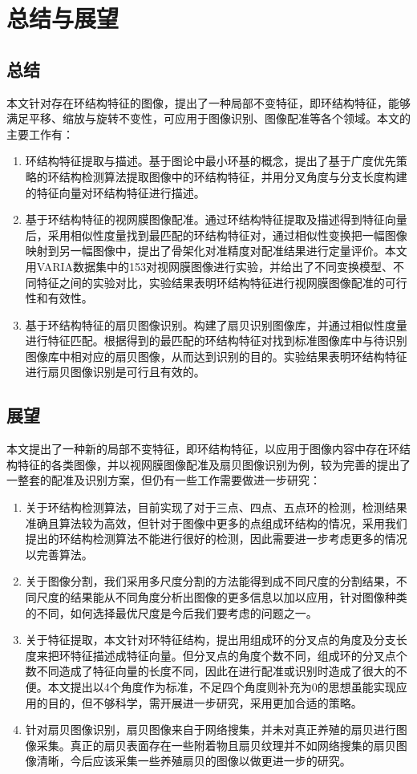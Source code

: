 

\chapter{总结与展望}
\label{cha:intro}

\section{总结}
\label{}
本文针对存在环结构特征的图像，提出了一种局部不变特征，即环结构特征，能够满足平移、缩放与旋转不变性，可应用于图像识别、图像配准等各个领域。本文的主要工作有：
\begin{enumerate}
\item 环结构特征提取与描述。基于图论中最小环基的概念，提出了基于广度优先策略的环结构检测算法提取图像中的环结构特征，并用分叉角度与分支长度构建的特征向量对环结构特征进行描述。

\item 基于环结构特征的视网膜图像配准。通过环结构特征提取及描述得到特征向量后，采用相似性度量找到最匹配的环结构特征对，通过相似性变换把一幅图像映射到另一幅图像中，提出了骨架化对准精度对配准结果进行定量评价。本文用VARIA数据集中的153对视网膜图像进行实验，并给出了不同变换模型、不同特征之间的实验对比，实验结果表明环结构特征进行视网膜图像配准的可行性和有效性。

\item 基于环结构特征的扇贝图像识别。构建了扇贝识别图像库，并通过相似性度量进行特征匹配。根据得到的最匹配的环结构特征对找到标准图像库中与待识别图像库中相对应的扇贝图像，从而达到识别的目的。实验结果表明环结构特征进行扇贝图像识别是可行且有效的。
\end{enumerate}
\section{展望}
\label{}
本文提出了一种新的局部不变特征，即环结构特征，以应用于图像内容中存在环结构特征的各类图像，并以视网膜图像配准及扇贝图像识别为例，较为完善的提出了一整套的配准及识别方案，但仍有一些工作需要做进一步研究：
\begin{enumerate}
\item 关于环结构检测算法，目前实现了对于三点、四点、五点环的检测，检测结果准确且算法较为高效，但针对于图像中更多的点组成环结构的情况，采用我们提出的环结构检测算法不能进行很好的检测，因此需要进一步考虑更多的情况以完善算法。
\item 关于图像分割，我们采用多尺度分割的方法能得到成不同尺度的分割结果，不同尺度的结果能从不同角度分析出图像的更多信息以加以应用，针对图像种类的不同，如何选择最优尺度是今后我们要考虑的问题之一。
\item 关于特征提取，本文针对环特征结构，提出用组成环的分叉点的角度及分支长度来把环特征描述成特征向量。但分叉点的角度个数不同，组成环的分叉点个数不同造成了特征向量的长度不同，因此在进行配准或识别时造成了很大的不便。本文提出以4个角度作为标准，不足四个角度则补充为0的思想虽能实现应用的目的，但不够科学，需开展进一步研究，采用更加合适的策略。
\item 针对扇贝图像识别，扇贝图像来自于网络搜集，并未对真正养殖的扇贝进行图像采集。真正的扇贝表面存在一些附着物且扇贝纹理并不如网络搜集的扇贝图像清晰，今后应该采集一些养殖扇贝的图像以做更进一步的研究。
\end{enumerate}
